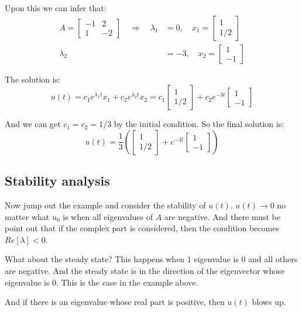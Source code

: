 \documentclass[10pt,a4paper,oneside,numbers=noenddot]{scrbook}
\theoremstyle{ctplain}
\theoremstyle{ctresult}
\begin{document}
Upon this we can infer that:
\begin{align*}
  A = \begin{bmatrix}
    -1 & 2 \\
    1 & -2
  \end{bmatrix}
  \quad \Rightarrow \quad
  \lambda_1 &= 0, \quad x_1 = \begin{bmatrix} 1 \\ 1/2 \end{bmatrix} \\
  \lambda_2 &= -3, \quad x_2 = \begin{bmatrix} 1 \\ -1 \end{bmatrix}
\end{align*}

The solution is:
\[
  u(t) = c_1 e^{\lambda_1 t} x_1 + c_2 e^{\lambda_2 t} x_2
  = c_1 \begin{bmatrix}
    1 \\
    1/2
  \end{bmatrix} +
  c_2 e^{-3t} \begin{bmatrix}
    1 \\
    -1
  \end{bmatrix}
\]

And we can get $c_1 = c_2 = 1/3$ by the initial condition. So the final solution is:
\[
  u(t) = \frac13 (\begin{bmatrix}
    1 \\
    1/2
  \end{bmatrix} +
  e^{-3t} \begin{bmatrix}
    1 \\
    -1
  \end{bmatrix})
\]

\subsection{Stability analysis}

Now jump out the example and consider the stability of $u(t)$. $u(t) \to 0$ no matter what
$u_0$ is when all eigenvalues of $A$ are negative. And there must be point out that if
the complex part is considered, then the condition becomes $Re[\lambda] < 0$.

What about the steady state? This happens when 1 eigenvalue is 0 and all others are
negative. And the steady state is in the direction of the eigenvector whose eigenvalue
is 0. This is the case in the example above.

And if there is an eigenvalue whose real part is positive, then $u(t)$ blows up.
\end{document}

